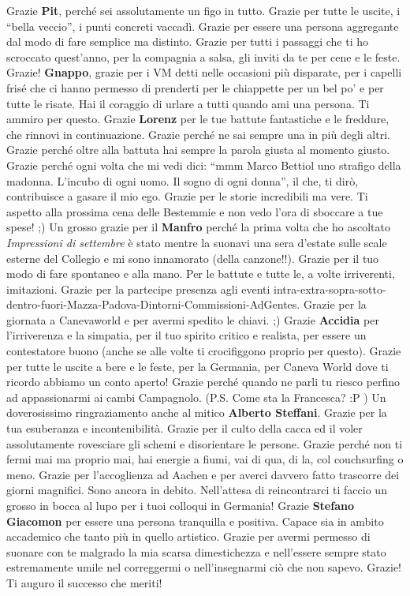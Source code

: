 \documentclass[10pt]{amsart}
\newcommand{\n}[1]{{\Large \bf #1}}
\begin{document}
Grazie \n{Pit}, perché sei assolutamente un figo in tutto. Grazie per tutte le uscite, i ``bella veccio'', i punti concreti vaccadì. Grazie per essere una persona aggregante dal modo di fare semplice ma distinto. Grazie per tutti i passaggi che ti ho scroccato quest'anno, per la compagnia a salsa, gli inviti da te per cene e le feste. Grazie! 
\n{Gnappo}, grazie per i VM detti nelle occasioni più disparate, per i capelli frisé che ci hanno permesso di prenderti per le chiappette per un bel po'  e per tutte le risate. Hai il coraggio di urlare a tutti quando ami una persona. Ti ammiro per questo.
Grazie \n{Lorenz} per le tue battute fantastiche e le freddure, che rinnovi in continuazione. Grazie perché ne sai sempre una in più degli altri. Grazie perché oltre alla battuta hai sempre la parola giusta al momento giusto. Grazie perché ogni volta che mi vedi dici: ``mmm Marco Bettiol uno strafigo della madonna. L'incubo di ogni uomo. Il sogno di ogni donna'', il che, ti dirò, contribuisce a gasare il mio ego. Grazie per le storie incredibili ma vere. Ti aspetto alla prossima cena delle Bestemmie e non vedo l'ora di sboccare a tue spese! ;)
Un grosso grazie per il \n{Manfro} perché la prima volta che ho ascoltato \emph{Impressioni di settembre} è stato mentre la suonavi una sera d'estate sulle scale esterne del Collegio e mi  sono innamorato (della canzone!!). Grazie per il tuo modo di fare spontaneo e alla mano. Per le battute e tutte le, a volte irriverenti, imitazioni. Grazie per la partecipe presenza agli eventi intra-extra-sopra-sotto-dentro-fuori-Mazza-Padova-Dintorni-Commissioni-AdGentes. Grazie per la giornata a Canevaworld e per avermi spedito le chiavi. ;) 
Grazie \n{Accidia} per l'irriverenza e la simpatia, per il tuo spirito critico e realista, per essere un contestatore buono (anche se alle volte ti crocifiggono proprio per questo). Grazie per tutte le uscite a bere e le feste, per la Germania, per Caneva World dove ti ricordo abbiamo un conto aperto! Grazie perché quando ne parli tu riesco perfino ad appassionarmi ai cambi Campagnolo. (P.S. Come sta la Francesca? :P ) Un doverosissimo ringraziamento anche al mitico \n{Alberto Steffani}. Grazie per la tua esuberanza e incontenibilità. Grazie per il culto della cacca ed il voler assolutamente rovesciare gli schemi e disorientare le persone. Grazie perché non ti fermi mai ma proprio mai, hai energie a fiumi, vai di qua, di la, col couchsurfing o meno. Grazie per l'accoglienza ad Aachen e per averci davvero fatto trascorre dei giorni magnifici. Sono ancora in debito. Nell'attesa di reincontrarci ti faccio un grosso in bocca al lupo per i tuoi colloqui in Germania! Grazie \n{Stefano Giacomon} per essere una persona tranquilla e positiva. Capace sia in ambito accademico che tanto più in quello artistico. Grazie per avermi permesso di suonare con te malgrado la mia scarsa dimestichezza e nell'essere sempre stato estremamente umile nel correggermi o nell'insegnarmi ciò che non sapevo. Grazie! Ti auguro il successo che meriti! 
\end{document}
